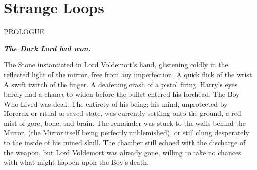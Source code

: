
\chapter*{Strange Loops}
\begin{center} \chapnumfont PROLOGUE \end{center}
\SomeVSpace
\SomeVSpace
\SomeVSpace
\textbf{\textit{The Dark Lord had won.}}\par
\simpleline



The Stone instantiated in Lord Voldemort’s hand, glistening coldly in the reflected light of the mirror, free from any imperfection.
\SmallVSpace
A quick flick of the wrist.
\SmallVSpace
A swift twitch of the finger.
\SmallVSpace
A deafening crash of a pistol firing.
\SmallVSpace
Harry’s eyes barely had a chance to widen before the bullet entered his forehead.
\SomeVSpace
The Boy Who Lived was dead.
\SomeVSpace
The entirety of his being; his mind, unprotected by Horcrux or ritual or saved state, was currently settling onto the ground, a red mist of gore, bone, and brain. The remainder was stuck to the walls behind the Mirror, (the Mirror itself being perfectly unblemished), or still clung desperately to the inside of his ruined skull. The chamber still echoed with the discharge of the weapon, but Lord Voldemort was already gone, willing to take no chances with what might happen upon the Boy’s death.

\simpleline



